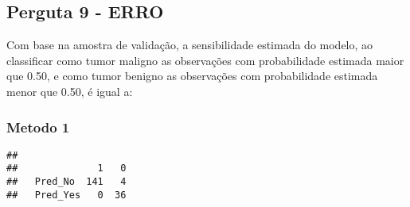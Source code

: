 \documentclass[
]{article}
\newenvironment{Shaded}{\begin{snugshade}}{\end{snugshade}}
\newcommand{\AttributeTok}[1]{\textcolor[rgb]{0.13,0.29,0.53}{#1}}
\newcommand{\FloatTok}[1]{\textcolor[rgb]{0.00,0.00,0.81}{#1}}
\newcommand{\FunctionTok}[1]{\textcolor[rgb]{0.13,0.29,0.53}{\textbf{#1}}}
\newcommand{\NormalTok}[1]{#1}
\newcommand{\OtherTok}[1]{\textcolor[rgb]{0.56,0.35,0.01}{#1}}
\newcommand{\SpecialCharTok}[1]{\textcolor[rgb]{0.81,0.36,0.00}{\textbf{#1}}}
\newcommand{\StringTok}[1]{\textcolor[rgb]{0.31,0.60,0.02}{#1}}
\begin{document}
\subsection{Perguta 9 - ERRO}\label{perguta-9---erro}

Com base na amostra de validação, a sensibilidade estimada do modelo, ao
classificar como tumor maligno as observações com probabilidade estimada
maior que 0.50, e como tumor benigno as observações com probabilidade
estimada menor que 0.50, é igual a:

\subsubsection{Metodo 1}\label{metodo-1}

\begin{Shaded}
\end{Shaded}

\begin{verbatim}
##           
##              1   0
##   Pred_No  141   4
##   Pred_Yes   0  36
\end{verbatim}
\end{document}
